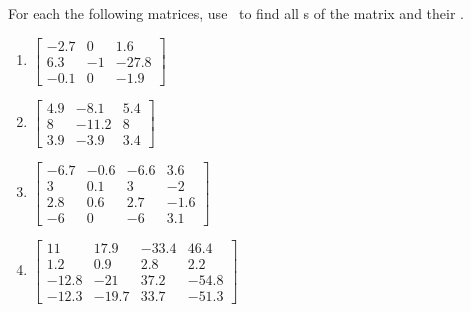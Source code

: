 \begin{exercise}  
For each the following matrices, use \script\ to find all s of the matrix and their .

\begin{enumerate}
\item \(\begin{bmatrix} -2.7 & 0 & 1.6
\\6.3 & -1 & -27.8
\\-0.1 & 0 & -1.9 \end{bmatrix}\)
\setbox\ajrqrbox\hbox{}%
\marginajrbox%

\item \(\begin{bmatrix} 4.9 & -8.1 & 5.4
\\8 & -11.2 & 8
\\3.9 & -3.9 & 3.4 \end{bmatrix}\)
\setbox\ajrqrbox\hbox{}%
\marginajrbox%

\item \(\begin{bmatrix} -6.7 & -0.6 & -6.6 & 3.6
\\3 & 0.1 & 3 & -2
\\2.8 & 0.6 & 2.7 & -1.6
\\-6 & 0 & -6 & 3.1 \end{bmatrix}\)
\setbox\ajrqrbox\hbox{}%
\marginajrbox%

\item \(\begin{bmatrix} 11 & 17.9 & -33.4 & 46.4
\\1.2 & 0.9 & 2.8 & 2.2
\\-12.8 & -21 & 37.2 & -54.8
\\-12.3 & -19.7 & 33.7 & -51.3 \end{bmatrix}\)
\setbox\ajrqrbox\hbox{}%
\marginajrbox%


\end{enumerate}
\end{exercise}
